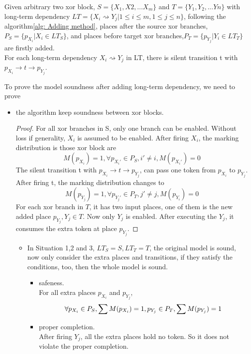 Given arbitrary two xor block, $S=\{X_1,X2,...X_m\}$ and $T=\{Y_1,Y_2,...Yn\}$ with long-term dependency $LT=\{X_i \rightsquigarrow Y_j \vert 1 \leq i \leq m, 1 \leq j \leq n \}$, following the algorithm\ref{alg: Adding method}, places after the source xor branches,  $P_S=\{p_{X_i} \vert X_i \in LT_{S} \}$, and places before target xor branches,$P_T=\{p_{Y_j} \vert Y_i \in LT_{T} \}$ are firstly added. \\ 
For each long-term dependency $X_{i} \rightsquigarrow Y_{j}$ in LT, there is silent transition t with $p_{X_i} \rightarrow t \rightarrow p_{Y_{j}}$.

To prove the model soundness after adding long-term dependency, we need to prove 
\begin{itemize}
	\item the algorithm keep soundness between xor blocks.
	\begin{proof}
		For all xor branches in S, only one branch can be enabled. Without loss if generality, $X_i$ is assumed to be enabled. After firing $X_i$, the marking distribution is those xor block are  
		\[ M(p_{X_i}) = 1, 
		\forall p_{X_i\prime} \in P_S, i\prime \neq i, M(p_{X_i\prime})=0 \]
		The silent transition t with $p_{X_i} \rightarrow t \rightarrow p_{Y_{j}}$, can pass one token from $p_{X_i}$  to $p_{Y_j}$. 
		After firing t, the marking distribution changes to 
		\[ M(p_{Y_j}) = 1, 
		\forall p_{Y_j\prime} \in P_T, j\prime \neq j,  M(p_{Y_i})=0 \]
		For each xor branch in $T$, it has two input places, one of them is the new added place $p_{Y_j}, Y_j \in T$.	Now only $Y_j$ is enabled. After executing the $Y_j$, it consumes the extra token at place $p_{Y_j}$. 
	\end{proof}
	\begin{itemize}
		\item In Situation 1,2 and 3, $ LT_S = S, LT_T = T$, the original model is sound, now only consider the extra places and transitions, if they satisfy the conditions, too, then the whole model is sound. 
		\begin{itemize}
			\item safeness. \\
			For all extra places $p_{X_i}$ and $p_{Y_j}$, 
			\[\forall p_{X_i} \in P_S, \sum M(p_{X_i})=1, \\
		  	   p_{Y_j} \in P_T,  \sum M(p_{Y_j})=1 \] 
			\item proper completion.\\ %
			After firing $Y_j$, all the extra places hold no token. So it does not violate the proper completion.

\end{itemize}
\end{itemize}
\end{itemize}
